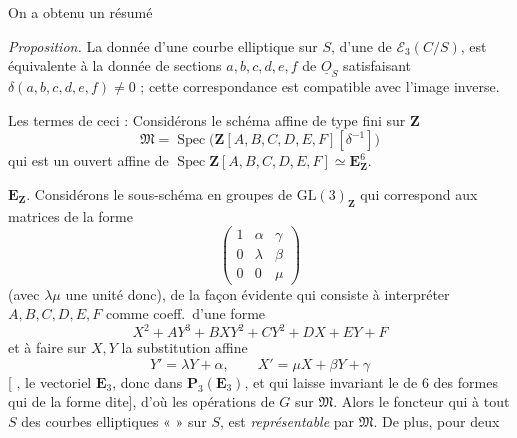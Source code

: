\documentclass[11pt,a4paper]{article}
\begin{document}
On a obtenu un résumé

\emph{Proposition.} La donnée d'une courbe elliptique sur $S$, 
\struck{\ill{}} d'une   de
$\mathcal{E}_3(C/S)$, \struck{\ill{}} est équivalente à la donnée de sections
$a,b,c,d,e,f$ de $\underline{O}_S$ satisfaisant $\delta(a,b,c,d,e,f)\neq 0$ ;
cette correspondance est compatible avec \struck{\ill{}} l'image inverse.

Les termes de ceci : Considérons le schéma affine de type fini sur $\mathbf{Z}$
\[
\mathfrak{M} = \operatorname{Spec}\bigl(\mathbf{Z}[A,B,C,D,E,F][\delta^{-1}]\bigr)
\]
qui est un ouvert affine de %
$\operatorname{Spec}\mathbf{Z}[A,B,C,D,E,F]
\simeq \mathbf{E}^6_{\mathbf{Z}}$. 

 $\mathbf{E}_{\mathbf{Z}}$.
Considérons le sous-schéma en groupes de $\mathrm{GL}(3)_{\mathbf{Z}}$ qui
correspond aux matrices de la forme
\[
\begin{pmatrix} 1 & \alpha & \gamma \\ 0 & \lambda & \beta \\ 0 & 0 & \mu \end{pmatrix}
\]
(avec $\lambda\mu$ une unité donc),  de la façon
évidente qui consiste à interpréter $A,B,C,D,E,F$ comme coeff.\ d'une forme
\[
X^2 + AY^3 + BXY^{2} + CY^2 + DX + EY + F
\]
et à faire sur $X, Y$ la substitution affine
\[
Y' = \lambda Y + \alpha, \qquad X' = \mu X + \beta Y + \gamma
\]
[\ill{} \ill{} \ill{} \ill{} \ill{} \ill{} \ill{}, \ill{} \ill{} \ill{}
\ill{} le vectoriel $\mathbf{E}_3$, donc dans $\mathbf{P}_3(\mathbf{E}_3)$, et qui
laisse invariant le \ill{} \struck{\ill{}} \add{\ill{}} de
 \struck{\ill{}} \ill{} $6$ des formes qui \ill{}
de la forme dite], d'où les opérations de $G$ sur $\mathfrak{M}$.
Alors le foncteur  qui à tout
$S$  \ill{} \ill{} des courbes elliptiques «  »
\ill{} \ill{} sur $S$, est \emph{représentable} par $\mathfrak{M}$.
De plus, pour deux \ill{} \ill{}
\end{document}
